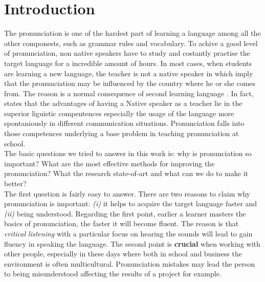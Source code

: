 \chapter{Introduction}
The pronunciation is one of the hardest part of learning a language among all the other componests, such as grammar rules and vocabulary. To achive a good level of pronunciation, non native speakers have to study and costantly practise the target language for a incredible amount of hours. In most cases, when students are learning a new language, the teacher is not a native speaker in which imply that the pronunciation may be influenced by the country where he or she comes from. The reason is a normal consequence of second learning language \cite{derwing2005second}. In fact, \cite{medgyes2001teacher} states that the advantages of having a Native speaker as a teacher lie in the superior liguistic compentences especially the usage of the language more spontaniously in different communication situations. Pronunciation falls into those competences underlying a base problem in teaching pronunciation at school.  \\

\noindent The basic questions we tried to answer in this work is: why is pronunciation so important? What are the most effective methods for improving the pronunciation? What the research state-of-art and what can we do to make it better? \\

\noindent The first question is fairly easy to answer. There are two reasons to claim why pronunciation is important: \textit{(i)} it helps to acquire the target language faster and \textit{(ii)} being understood.
Regarding the first point, earlier a learner masters the basics of pronunciation, the faster it will become fluent. The reason is that \textit{critical listening} with a particular focus on hearing the sounds will lead to gain fluency in speaking the language.
The second point is \textbf{crucial} when working with other people, especially in these days where both in school and business the environment is often multicultural. Pronunciation mistakes may lead the person to being misunderstood affecting the results of a project for example. \\

